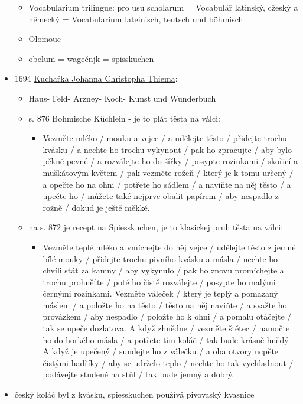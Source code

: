 \begin{itemize}
  \begin{itemize}
  \tightlist
  \item
    Vocabularium trilingue: pro usu scholarum = Vocabulár̆ latinský,
    cz̆eský a nĕmecký = Vocabularium lateinisch, teutsch und böhmisch
  \item
    Olomouc
  \item
    obelum = wagečnjk = spisskuchen
  \end{itemize}
\item
  1694
  \href{https://books.google.cz/books?id=PytAAAAAcAAJ&hl=cs&pg=PA876\#v=onepage&q&f=false}{Kuchařka
  Johanna Christopha Thiema}:

  \begin{itemize}
  \tightlist
  \item
    Haus- Feld- Arzney- Koch- Kunst und Wunderbuch
  \item
    s. 876 Bohmische Küchlein - je to plát těsta na válci:

    \begin{itemize}
    \tightlist
    \item
      Vezměte mléko / mouku a vejce / a udělejte těsto / přidejte trochu
      kvásku / a nechte ho trochu vykynout / pak ho zpracujte / aby bylo
      pěkně pevné / a rozválejte ho do šířky / posypte rozinkami /
      skořicí a muškátovým květem / pak vezměte rožeň / který je k tomu
      určený / a opečte ho na ohni / potřete ho sádlem / a naviňte na
      něj těsto / a upečte ho / můžete také nejprve obalit papírem / aby
      nespadlo z rožně / dokud je ještě měkké.
    \end{itemize}
  \item
    na s. 872 je recept na Spiesskuchen, je to klasickej pruh těsta na
    válci:

    \begin{itemize}
    \tightlist
    \item
      Vezměte teplé mléko a vmíchejte do něj vejce / udělejte těsto z
      jemné bílé mouky / přidejte trochu pivního kvásku a másla / nechte
      ho chvíli stát za kamny / aby vykynulo / pak ho znovu promíchejte
      a trochu prohněťte / poté ho čistě rozválejte / posypte ho malými
      černými rozinkami. Vezměte váleček / který je teplý a pomazaný
      máslem / a položte ho na těsto / těsto na něj naviňte / a svažte
      ho provázkem / aby nespadlo / položte ho k ohni / a pomalu
      otáčejte / tak se upeče dozlatova. A když zhnědne / vezměte štětec
      / namočte ho do horkého másla / a potřete tím koláč / tak bude
      krásně hnědý. A když je upečený / sundejte ho z válečku / a oba
      otvory ucpěte čistými hadříky / aby se udrželo teplo / nechte ho
      tak vychladnout / podávejte studené na stůl / tak bude jemný a
      dobrý.
    \end{itemize}
  \end{itemize}
\item
  český koláč byl z kvásku, spiesskuchen používá pivovaský kvasnice
\end{itemize}

